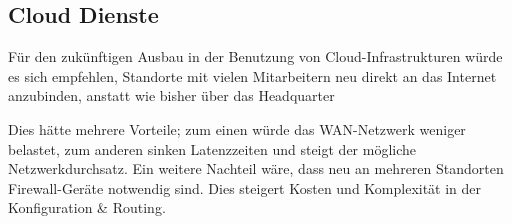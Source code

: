 \subsection{Cloud Dienste}

Für den zukünftigen Ausbau in der Benutzung von Cloud-Infrastrukturen würde es sich empfehlen, Standorte mit vielen Mitarbeitern neu direkt an das Internet anzubinden, anstatt wie bisher über das Headquarter

Dies hätte mehrere Vorteile; zum einen würde das WAN-Netzwerk weniger belastet, zum anderen sinken Latenzzeiten und steigt der mögliche Netzwerkdurchsatz. Ein weitere Nachteil wäre, dass neu an mehreren Standorten Firewall-Geräte notwendig sind. Dies steigert Kosten und Komplexität in der Konfiguration \& Routing.



